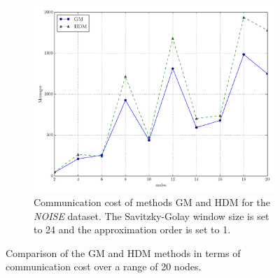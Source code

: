 \begin{figure}[!htb]
\begin{subfigure}{0.32\textwidth}
\end{subfigure}\hfill
\begin{subfigure}{0.32\textwidth}%
  \includegraphics[width=\linewidth]{img/main_msg_noisyinterweaving_nodes.pdf}
  \caption{Communication cost of methods GM and HDM for the \emph{NOISE} dataset. The Savitzky-Golay window size is set to 24 and the approximation order is set to 1.}
\end{subfigure}
\vspace{0.5cm}
\caption{Comparison of the GM and HDM methods in terms of communication cost over a range of 20 nodes.} \label{fig:mainComp-msgs}
\end{figure}

